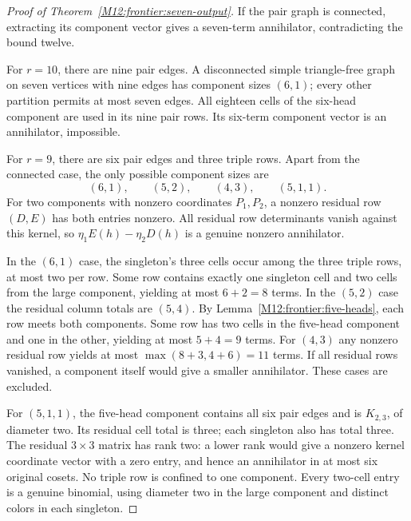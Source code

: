 \documentclass[11pt,a4paper,oneside]{report}
\theoremstyle{definition}
\theoremstyle{remark}
\begin{document}
\begin{proof}[Proof of Theorem~\ref{M12:frontier:seven-output}]
If the pair graph is connected, extracting its component vector gives
a seven-term annihilator, contradicting the bound twelve.

For $r=10$, there are nine pair edges. A disconnected simple
triangle-free graph on seven vertices with nine edges has component
sizes $(6,1)$; every other partition permits at most seven edges.
All eighteen cells of the six-head component are used in its nine
pair rows. Its six-term component vector is an annihilator, impossible.

For $r=9$, there are six pair edges and three triple rows. Apart from
the connected case, the only possible component sizes are
\[
 (6,1),\qquad(5,2),\qquad(4,3),\qquad(5,1,1).
\]
For two components with nonzero coordinates $P_1,P_2$, a nonzero
residual row $(D,E)$ has both entries nonzero. All residual row
determinants vanish against this kernel, so
$\eta_1E(h)-\eta_2D(h)$ is a genuine nonzero annihilator.

In the $(6,1)$ case, the singleton's three cells occur among the
three triple rows, at most two per row. Some row contains exactly
one singleton cell and two cells from the large component, yielding
at most $6+2=8$ terms. In the $(5,2)$ case the residual column totals
are $(5,4)$. By Lemma~\ref{M12:frontier:five-heads}, each row meets both
components. Some row has two cells in the five-head component and
one in the other, yielding at most $5+4=9$ terms. For $(4,3)$ any
nonzero residual row yields at most $\max(8+3,4+6)=11$ terms.
If all residual rows vanished, a component itself would give a smaller
annihilator. These cases are excluded.

For $(5,1,1)$, the five-head component contains all six pair edges
and is $K_{2,3}$, of diameter two. Its residual cell total is three;
each singleton also has total three. The residual $3\times3$ matrix
has rank two: a lower rank would give a nonzero kernel coordinate
vector with a zero entry, and hence an annihilator in at most six
original cosets. No triple row is confined to one component. Every
two-cell entry is a genuine binomial, using diameter two in the large
component and distinct colors in each singleton.


\end{proof}
\end{document}

